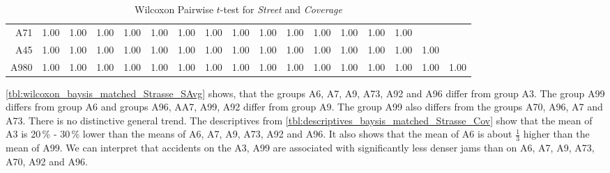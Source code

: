\begin{table}[ht]
\begin{tabular}{rrrrrrrrrrrrrrrrr}
	  	A71 	& 1.00 & 1.00 & 1.00 & 1.00 & 1.00 & 1.00 & 1.00 & 1.00 & 1.00 & 1.00 & 1.00 & 1.00 & 1.00 & 1.00 &  &  \\ 
	  	A45 	& 1.00 & 1.00 & 1.00 & 1.00 & 1.00 & 1.00 & 1.00 & 1.00 & 1.00 & 1.00 & 1.00 & 1.00 & 1.00 & 1.00 & 1.00 &  \\ 
	  	A980 	& 1.00 & 1.00 & 1.00 & 1.00 & 1.00 & 1.00 & 1.00 & 1.00 & 1.00 & 1.00 & 1.00 & 1.00 & 1.00 & 1.00 & 1.00 & 1.00 \\ 
	   	\bottomrule
	\end{tabular}
	\caption{Wilcoxon Pairwise $t$-test for \textit{Street} and \textit{Coverage}}
	\label{tbl:wilcoxon_baysis_matched_Strasse_Cov}
\end{table}
\autoref{tbl:wilcoxon_baysis_matched_Strasse_SAvg} shows, that the groups A6, A7, A9, A73, A92 and A96 differ from group A3. The group A99 differs from group A6 and groups A96, AA7, A99, A92 differ from group A9. The group A99 also differs from the groups A70, A96, A7 and A73. There is no distinctive general trend. The descriptives from \autoref{tbl:descriptives_baysis_matched_Strasse_Cov} show that the mean of A3 is 20\,\% - 30\,\% lower than the means of A6, A7, A9, A73, A92 and A96. It also shows that the mean of A6 is about $\frac{1}{3}$ higher than the mean of A99. We can interpret that accidents on the A3, A99 are associated with significantly less denser jams than on A6, A7, A9, A73, A70, A92 and A96.
